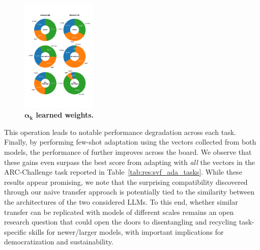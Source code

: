 \begin{figure}
\vspace{-12mm}
\begin{center}
    \includegraphics[width=0.32\textwidth]{images/cem_plot_vertical_tb.pdf}
  \end{center}
  \vspace{-10mm}
  \caption{\textbf{$\boldsymbol{\alpha_k}$ learned weights.}}
  \label{fig:cem}
  \vspace{-4mm}
\end{figure}

This operation leads to notable performance degradation across each task. 
Finally, by performing few-shot adaptation using the \svdacro vectors collected from both models, the performance of \mistral further improves across the board.
We observe that these gains even surpass the best score from adapting \mistral with \textit{all} the \svdacro vectors in the ARC-Challenge task reported in Table~\ref{tab:res:svf_ada_tasks}.  
While these results appear promising, we note that the surprising compatibility discovered through our naive transfer approach is potentially tied to the similarity between the architectures of the two considered LLMs.
To this end, whether similar transfer can be replicated with models of different scales remains an open research question that could open the doors to disentangling and recycling task-specific skills for newer/larger models, with important implications for democratization and sustainability.


